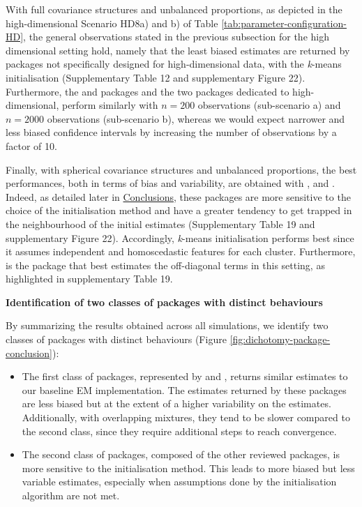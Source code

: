 With full covariance structures and unbalanced proportions, as depicted in the high-dimensional Scenario HD8a) and b) of Table \ref{tab:parameter-configuration-HD}, the general observations stated in the previous subsection for the high dimensional setting hold, namely that the least biased estimates are returned by packages not specifically designed for high-dimensional data, with the \emph{k}-means initialisation (Supplementary Table 12 and supplementary Figure 22). Furthermore, the  and  packages and the two packages dedicated to high-dimensional, perform similarly with \(n=200\) observations (sub-scenario a) and \(n=2000\) observations (sub-scenario b), whereas we would expect narrower and less biased confidence intervals by increasing the number of observations by a factor of 10.

Finally, with spherical covariance structures and unbalanced proportions, the best performances, both in terms of bias and variability, are obtained with ,  and . Indeed, as detailed later in \protect\hyperlink{conclusions}{Conclusions}, these packages are more sensitive to the choice of the initialisation method and have a greater tendency to get trapped in the neighbourhood of the initial estimates (Supplementary Table 19 and supplementary Figure 22). Accordingly, \emph{k}-means initialisation performs best since it assumes independent and homoscedastic features for each cluster.
Furthermore,  is the package that best estimates the off-diagonal terms in this setting, as highlighted in supplementary Table 19.

\textbf{Identification of two classes of packages with distinct behaviours}

By summarizing the results obtained across all simulations, we identify two classes of packages with distinct behaviours (Figure
\ref{fig:dichotomy-package-conclusion}):

\begin{itemize}
\item
  The first class of packages, represented by  and , returns similar estimates to our baseline EM implementation. The estimates returned by these packages are less biased but at the extent of a higher variability on the estimates. Additionally, with overlapping mixtures, they tend to be slower compared to the second class, since they require additional steps to reach convergence.
\item
  The second class of packages, composed of the other
  reviewed packages, is more sensitive to the initialisation method. This leads to more
  biased but less variable estimates, especially when assumptions done by
  the initialisation algorithm are not met.
\end{itemize}


